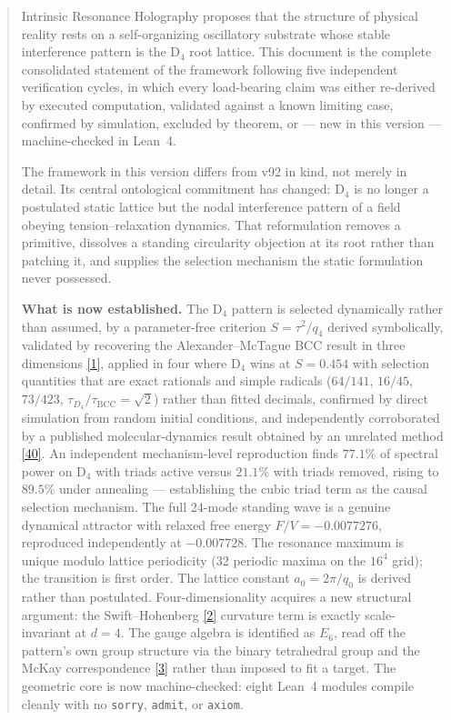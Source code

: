 \documentclass[a4paper,11pt]{article}
\begin{document}
\begin{abstract}
Intrinsic Resonance Holography proposes that the structure of physical reality rests on a self-organizing oscillatory substrate whose stable interference pattern is the D$_4$ root lattice. This document is the complete consolidated statement of the framework following five independent verification cycles, in which every load-bearing claim was either re-derived by executed computation, validated against a known limiting case, confirmed by simulation, excluded by theorem, or --- new in this version --- machine-checked in Lean~4.

The framework in this version differs from v92 in kind, not merely in detail. Its central ontological commitment has changed: D$_4$ is no longer a postulated static lattice but the nodal interference pattern of a field obeying tension--relaxation dynamics. That reformulation removes a primitive, dissolves a standing circularity objection at its root rather than patching it, and supplies the selection mechanism the static formulation never possessed.

\textbf{What is now established.} The D$_4$ pattern is selected dynamically rather than assumed, by a parameter-free criterion $S=\tau^2/q_4$ derived symbolically, validated by recovering the Alexander--McTague BCC result in three dimensions \hyperref[ref1]{[1]}, applied in four where D$_4$ wins at $S=0.454$ with selection quantities that are exact rationals and simple radicals ($64/141$, $16/45$, $73/423$, $\tau_{D_4}/\tau_{\mathrm{BCC}}=\sqrt{2}$) rather than fitted decimals, confirmed by direct simulation from random initial conditions, and independently corroborated by a published molecular-dynamics result obtained by an unrelated method \hyperref[ref40]{[40]}. An independent mechanism-level reproduction finds $77.1\%$ of spectral power on D$_4$ with triads active versus $21.1\%$ with triads removed, rising to $89.5\%$ under annealing --- establishing the cubic triad term as the causal selection mechanism. The full 24-mode standing wave is a genuine dynamical attractor with relaxed free energy $F/V=-0.0077276$, reproduced independently at $-0.007728$. The resonance maximum is unique modulo lattice periodicity (32 periodic maxima on the $16^4$ grid); the transition is first order. The lattice constant $a_0=2\pi/q_0$ is derived rather than postulated. Four-dimensionality acquires a new structural argument: the Swift--Hohenberg \hyperref[ref2]{[2]} curvature term is exactly scale-invariant at $d=4$. The gauge algebra is identified as $E_6$, read off the pattern's own group structure via the binary tetrahedral group and the McKay correspondence \hyperref[ref3]{[3]} rather than imposed to fit a target. The geometric core is now machine-checked: eight Lean~4 modules compile cleanly with no \texttt{sorry}, \texttt{admit}, or \texttt{axiom}.


\end{abstract}
\end{document}
